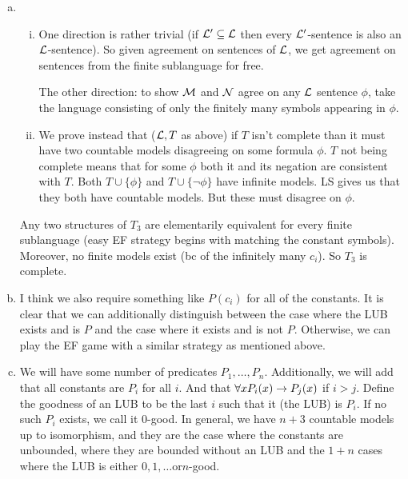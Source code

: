 \begin{enumerate}[1.]
\begin{enumerate}[a)]
    \item
      \begin{enumerate}[i)]
        \item One direction is rather trivial (if \(\mathcal{L}' \subseteq \mathcal{L}\) then every \(\mathcal{L}'\)-sentence is also an \(\mathcal{L}\)-sentence). So given agreement on sentences of \(\mathcal{L}\), we get agreement on sentences from the finite sublanguage for free.

The other direction: to show \(\mathcal{M}\) and \(\mathcal{N}\) agree on any \(\mathcal{L}\) sentence \(\phi\), take the language consisting of only the finitely many symbols appearing in \(\phi\). 

        \item We prove instead that (\(\mathcal{L}, T\) as above) if \(T\) isn't complete than it must have two countable models disagreeing on some formula \(\phi\). \(T\) not being complete means that for some \(\phi\) both it and its negation are consistent with \(T\). Both \(T \cup \{\phi\}\) and \(T \cup \{\neg \phi\}\) have infinite models. LS gives us that they both have countable models. But these must disagree on \(\phi\). 

      \end{enumerate}

   Any two structures of \(T_3\) are elementarily equivalent for every finite sublanguage (easy EF strategy begins with matching the constant symbols). Moreover, no finite models exist (bc of the infinitely many \(c_i\)). So \(T_3\) is complete. 

    \item I think we also require something like \(P(c_i)\) for all of the constants. It is clear that we can additionally distinguish between the case where the LUB exists and is \(P\) and the case where it exists and is not \(P\). Otherwise, we can play the EF game with a similar strategy as mentioned above. 

    \item We will have some number of predicates \(P_1, \ldots, P_n\). Additionally, we will add that all constants are \(P_i\) for all \(i\). And that \(\forall x P_i(x) \to P_j(x)\) if \(i > j\). Define the goodness of an LUB to be the last \(i\) such that it (the LUB) is \(P_i\). If no such \(P_i\) exists, we call it \(0\)-good.  In general, we have \(n+3\) countable models up to isomorphism, and they are the case where the constants are unbounded, where they are bounded without an LUB and the \(1+n\) cases where the LUB is either \(0, 1, \ldots \text{or} n\)-good. 


\end{enumerate}
\end{enumerate}
